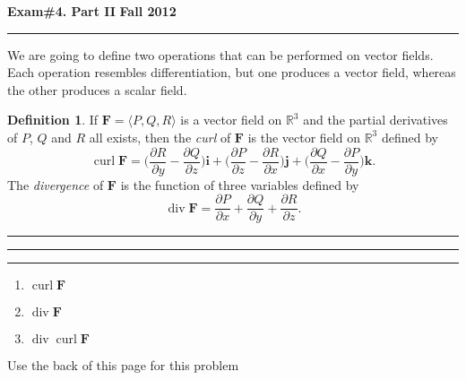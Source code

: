 \documentclass[12pt]{amsart}
\theoremstyle{definition}
\newtheorem*{defn}{Definition}
\begin{document}
\thispagestyle{empty}
\hfill{\large\bf Exam\#4. Part II}\hfill{\large\bf
  Fall 2012}\hrule

\bigskip
\noindent We are going to define two operations that can be performed on vector
fields.  Each operation resembles differentiation, but one produces a
vector field, whereas the other produces a scalar field.

\begin{defn}
If $\boldsymbol{F}=\langle P,Q,R \rangle$ is a vector field on
$\mathbb{R}^3$ and the partial derivatives of $P$, $Q$ and $R$ all
exists, then the {\em curl} of $\boldsymbol{F}$ is the vector field on
$\mathbb{R}^3$ defined by
\begin{equation*}
\operatorname{curl} \boldsymbol{F} = \bigg( \frac{\partial R}{\partial y} -
\frac{\partial Q}{\partial z} \bigg) \boldsymbol{i} + \bigg(
\frac{\partial P}{\partial z} - \frac{\partial R}{\partial x} \bigg)
\boldsymbol{j} + \bigg( \frac{\partial Q}{\partial x} - \frac{\partial
P}{\partial y} \bigg) \boldsymbol{k}.
\end{equation*}
The {\em divergence} of $\boldsymbol{F}$ is the function of three
variables defined by
\begin{equation*}
\operatorname{div} \boldsymbol{F} = \frac{\partial P}{\partial x} +
\frac{\partial Q}{\partial y} + \frac{\partial R}{\partial z}.
\end{equation*}
\end{defn}
\hrule


\vspace{4cm}
\hrule
{} 

\vspace{7cm}
\hrule
{}
\begin{enumerate}
\item $\operatorname{curl} \boldsymbol{F}$
\item $\operatorname{div} \boldsymbol{F}$
\item $\operatorname{div} \operatorname{curl} \boldsymbol{F}$
\end{enumerate}
Use the back of this page for this problem
\end{document}
